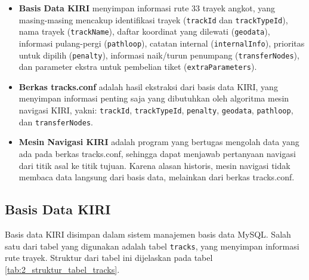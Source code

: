 \begin{itemize}
	\item \textbf{Basis Data KIRI} menyimpan informasi rute 33 trayek angkot, yang masing-masing mencakup identifikasi trayek (\verb/trackId/ dan \verb/trackTypeId/), nama trayek (\verb/trackName/), daftar koordinat yang dilewati (\verb/geodata/), informasi pulang-pergi (\verb/pathloop/), catatan internal (\verb/internalInfo/), prioritas untuk dipilih (\verb/penalty/), informasi naik/turun penumpang (\verb/transferNodes/), dan parameter ekstra untuk pembelian tiket (\verb/extraParameters/).
	\item \textbf{Berkas tracks.conf} adalah hasil ekstraksi dari basis data KIRI, yang menyimpan informasi penting saja yang dibutuhkan oleh algoritma mesin navigasi KIRI, yakni: \verb/trackId/, \verb/trackTypeId/, \verb/penalty/, \verb/geodata/, \verb/pathloop/, dan \verb/transferNodes/.
	\item \textbf{Mesin Navigasi KIRI} adalah program yang bertugas mengolah data yang ada pada berkas tracks.conf, sehingga dapat menjawab pertanyaan navigasi dari titik asal ke titik tujuan. Karena alasan historis, mesin navigasi tidak membaca data langsung dari basis data, melainkan dari berkas tracks.conf.
\end{itemize}

\subsection{Basis Data KIRI}
Basis data KIRI disimpan dalam sistem manajemen basis data MySQL. Salah satu dari tabel yang digunakan adalah tabel \verb/tracks/, yang menyimpan informasi rute trayek. Struktur dari tabel ini dijelaskan pada tabel \ref{tab:2_struktur_tabel_tracks}.

